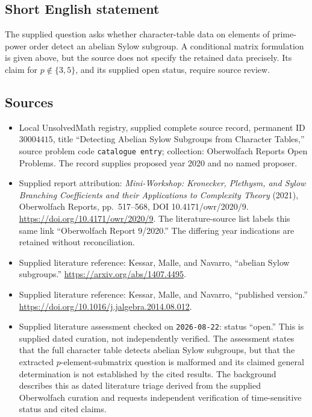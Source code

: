 \documentclass[11pt]{article}
\begin{document}
\subsection{Short English statement}
The supplied question asks whether character-table data on elements of prime-power order detect an abelian Sylow subgroup. A conditional matrix formulation is given above, but the source does not specify the retained data precisely. Its claim for \(p\notin\{3,5\}\), and its supplied open status, require source review.
\subsection{Sources}
\begin{itemize}
\item Local UnsolvedMath registry, supplied complete source record, permanent ID \(30004415\), title ``Detecting Abelian Sylow Subgroups from Character Tables,'' source problem code \texttt{catalogue entry}; collection: Oberwolfach Reports Open Problems. The record supplies proposed year 2020 and no named proposer.
\item Supplied report attribution: \emph{Mini-Workshop: Kronecker, Plethysm, and Sylow Branching Coefficients and their Applications to Complexity Theory} (2021), Oberwolfach Reports, pp.\ 517--568, DOI 10.4171/owr/2020/9. \url{https://doi.org/10.4171/owr/2020/9}. The literature-source list labels this same link ``Oberwolfach Report 9/2020.'' The differing year indications are retained without reconciliation.
\item Supplied literature reference: Kessar, Malle, and Navarro, ``abelian Sylow subgroups.'' \url{https://arxiv.org/abs/1407.4495}.
\item Supplied literature reference: Kessar, Malle, and Navarro, ``published version.'' \url{https://doi.org/10.1016/j.jalgebra.2014.08.012}.
\item Supplied literature assessment checked on \texttt{2026-08-22}: status ``open.'' This is supplied dated curation, not independently verified. The assessment states that the full character table detects abelian Sylow subgroups, but that the extracted \(p\)-element-submatrix question is malformed and its claimed general determination is not established by the cited results. The background describes this as dated literature triage derived from the supplied Oberwolfach curation and requests independent verification of time-sensitive status and cited claims.
\end{itemize}
\end{document}
